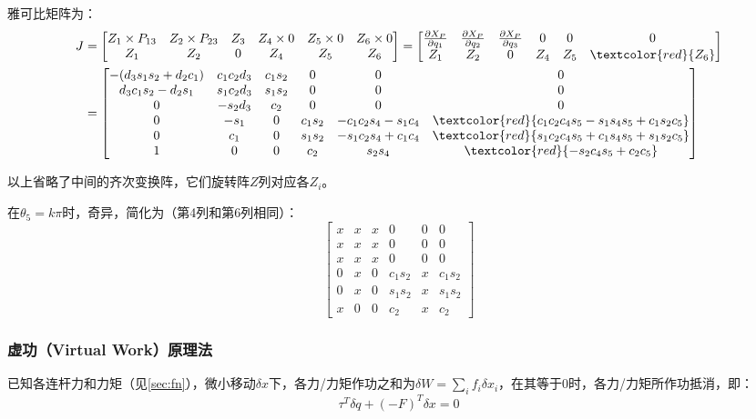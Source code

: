 \documentclass[
12pt, %
a4paper, 
oneside, %
headinclude,footinclude, %
]{scrartcl}
\begin{document}
雅可比矩阵为：
{\scriptsize
\begin{align*}
J &= \begin{bmatrix} Z_1 \times P_{13} & Z_2 \times P_{23} & Z_3 & Z_4 \times 0 & Z_5 \times 0 & Z_6 \times 0 \\ Z_1 & Z_2 & 0 & Z_4 & Z_5 & Z_6 \end{bmatrix}
= \begin{bmatrix} \frac{\partial X_P}{\partial q_1} & \frac{\partial X_P}{\partial q_2} & \frac{\partial X_P}{\partial q_3} & 0 & 0 & 0 \\ Z_1 & Z_2 & 0 & Z_4 & Z_5 & \textcolor{red}{Z_6} \end{bmatrix} \\
&=
\begin{bmatrix}
-(d_3 s_1 s_2 + d_2 c_1) & c_1 c_2 d_3 & c_1 s_2 & 0 & 0 & 0 \\
d_3 c_1 s_2 - d_2 s_1 & s_1 c_2 d_3 & s_1 s_2 & 0 & 0 & 0 \\
0 & -s_2 d_3 & c_2 & 0 & 0 & 0 \\
0 & -s_1 & 0 & c_1 s_2 & -c_1 c_2 s_4 - s_1 c_4 & \textcolor{red}{c_1 c_2 c_4 s_5 - s_1 s_4 s_5 + c_1 s_2 c_5} \\
0 & c_1 & 0 & s_1 s_2 & -s_1 c_2 s_4 + c_1 c_4 & \textcolor{red}{s_1 c_2 c_4 s_5 + c_1 s_4 s_5 + s_1 s_2 c_5} \\
1 & 0 & 0 & c_2 & s_2 s_4 & \textcolor{red}{-s_2 c_4 s_5 + c_2 c_5}
\end{bmatrix}
\end{align*}}

以上省略了中间的齐次变换阵，它们旋转阵$ Z $列对应各$ Z_i $。

在$ \theta_5 = k\pi $时，奇异，简化为（第4列和第6列相同）：
{\scriptsize
$$
\begin{bmatrix}
x & x & x& 0 & 0 & 0 \\
x & x & x & 0 & 0 & 0 \\
x & x & x& 0 & 0 & 0 \\
0 & x & 0 & c_1 s_2 & x & c_1 s_2 \\
0 & x & 0 & s_1 s_2 & x & s_1 s_2 \\
x & 0 & 0 & c_2 & x& c_2
\end{bmatrix}
$$}
\subsubsection{虚功（Virtual Work）原理法}
已知各连杆力和力矩（见\ref{sec:fn}），微小移动$ \delta x $下，各力/力矩作功之和为$ \delta W = \sum_i f_i \delta x_i $，在其等于$ 0 $时，各力/力矩所作功抵消，即：
$$ \tau^T \delta q + (-F)^T \delta x = 0 $$
\end{document}
